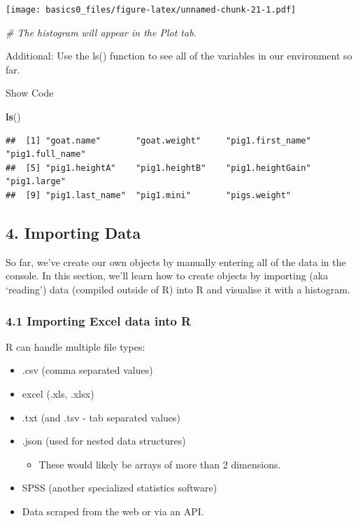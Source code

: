 \documentclass[
]{article}
\newenvironment{Shaded}{\begin{snugshade}}{\end{snugshade}}
\newcommand{\CommentTok}[1]{\textcolor[rgb]{0.56,0.35,0.01}{\textit{#1}}}
\newcommand{\FunctionTok}[1]{\textcolor[rgb]{0.13,0.29,0.53}{\textbf{#1}}}
\newcommand{\NormalTok}[1]{#1}
\providecommand{\tightlist}{%
  \setlength{\itemsep}{0pt}\setlength{\parskip}{0pt}}
\begin{document}
\texttt{[image: basics0\_files/figure-latex/unnamed-chunk-21-1.pdf]}

\begin{Shaded}
\begin{Highlighting}[]
\CommentTok{\# The histogram will appear in the Plot tab.}
\end{Highlighting}
\end{Shaded}

Additional: Use the ls() function to see all of the variables in our
environment so far.

Show Code

\begin{Shaded}
\begin{Highlighting}[]
\FunctionTok{ls}\NormalTok{()}
\end{Highlighting}
\end{Shaded}

\begin{verbatim}
##  [1] "goat.name"       "goat.weight"     "pig1.first_name" "pig1.full_name" 
##  [5] "pig1.heightA"    "pig1.heightB"    "pig1.heightGain" "pig1.large"     
##  [9] "pig1.last_name"  "pig1.mini"       "pigs.weight"
\end{verbatim}

\hypertarget{importing-data}{%
\subsection{4. Importing Data}\label{importing-data}}

So far, we've create our own objects by manually entering all of the
data in the console. In this section, we'll learn how to create objects
by importing (aka `reading') data (compiled outside of R) into R and
visualise it with a histogram.

\hypertarget{importing-excel-data-into-r}{%
\subsubsection{4.1 Importing Excel data into
R}\label{importing-excel-data-into-r}}

R can handle multiple file types:

\begin{itemize}
\tightlist
\item
  .csv (comma separated values)
\item
  excel (.xls, .xlsx)
\item
  .txt (and .tsv - tab separated values)
\item
  .json (used for nested data structures)

  \begin{itemize}
  \tightlist
  \item
    These would likely be arrays of more than 2 dimensions.
  \end{itemize}
\item
  SPSS (another specialized statistics software)
\item
  Data scraped from the web or via an API.
\end{itemize}
\end{document}
